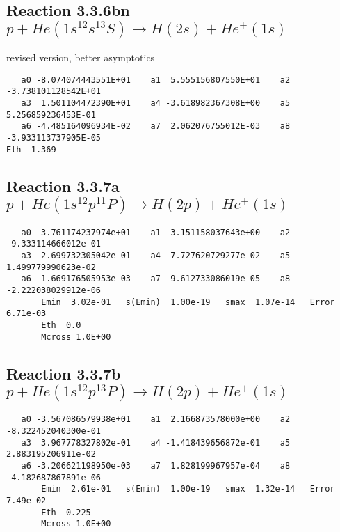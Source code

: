 \documentclass[12pt,dvipdfmx]{article}
\begin{document}
\subsection{
Reaction 3.3.6bn $   p + He(1s^12s^13S) \rightarrow H(2s) + He^+(1s)$}
revised version,  better asymptotics

\begin{small}\begin{verbatim}
   a0 -8.074074443551E+01    a1  5.555156807550E+01    a2 -3.738101128542E+01
   a3  1.501104472390E+01    a4 -3.618982367308E+00    a5  5.256859236453E-01
   a6 -4.485164096934E-02    a7  2.062076755012E-03    a8 -3.933113737905E-05
Eth  1.369
\end{verbatim}\end{small}
\newpage

\subsection{
Reaction 3.3.7a $   p + He(1s^12p^11P) \rightarrow H(2p) + He^+(1s)$}


\begin{small}\begin{verbatim}
   a0 -3.761174237974e+01    a1  3.151158037643e+00    a2 -9.333114666012e-01
   a3  2.699732305042e-01    a4 -7.727620729277e-02    a5  1.499779990623e-02
   a6 -1.669176505953e-03    a7  9.612733086019e-05    a8 -2.222038029912e-06
       Emin  3.02e-01   s(Emin)  1.00e-19   smax  1.07e-14   Error  6.71e-03
       Eth  0.0
       Mcross 1.0E+00
\end{verbatim}\end{small}

\newpage
\subsection{
Reaction 3.3.7b $   p + He(1s^12p^13P) \rightarrow H(2p) + He^+(1s)$}


\begin{small}\begin{verbatim}
   a0 -3.567086579938e+01    a1  2.166873578000e+00    a2 -8.322452040300e-01
   a3  3.967778327802e-01    a4 -1.418439656872e-01    a5  2.883195206911e-02
   a6 -3.206621198950e-03    a7  1.828199967957e-04    a8 -4.182687867891e-06
       Emin  2.61e-01   s(Emin)  1.00e-19   smax  1.32e-14   Error  7.49e-02
       Eth  0.225
       Mcross 1.0E+00
\end{verbatim}\end{small}
\end{document}
